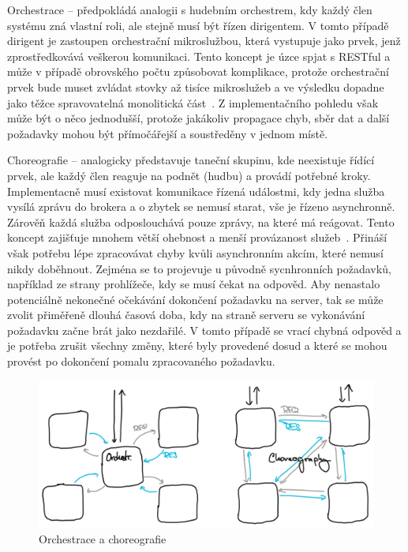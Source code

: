 \begin{dl}
   \item [Orchestrace] – předpokládá analogii s hudebním orchestrem, kdy každý člen systému zná vlastní roli, ale stejně musí být řízen dirigentem.
   V tomto případě dirigent je zastoupen orchestrační mikroslužbou, která vystupuje jako prvek, jenž zprostředkovává veškerou komunikaci.
   Tento koncept je úzce spjat s RESTful  a může v případě obrovského počtu  způsobovat komplikace, protože orchestrační prvek bude muset zvládat stovky až tisíce mikroslužeb a ve výsledku dopadne jako těžce spravovatelná monolitická část~\cite{choreovsorch}.
   Z implementačního pohledu však může být o něco jednodušší, protože jakákoliv propagace chyb, sběr dat a další požadavky mohou být přímočářejší a soustředěny v jednom místě.

   \item [Choreografie] – analogicky představuje taneční skupinu, kde neexistuje řídící prvek, ale každý člen reaguje na podnět (hudbu) a provádí potřebné kroky.
   Implementacně musí existovat komunikace řízená událostmi, kdy jedna služba vysílá zprávu do brokera a o zbytek se nemusí starat, vše je řízeno asynchronně.
   Zárověň každá služba odposlouchává pouze zprávy, na které má reágovat.
   Tento koncept zajišťuje mnohem větší ohebnost a menší provázanost služeb~\cite{choreovsorch}.
   Přináší však potřebu lépe zpracovávat chyby kvůli asynchronním akcím, které nemusí nikdy doběhnout.
   Zejména se to projevuje u původně sycnhronních požadavků, například ze strany prohlížeče, kdy se musí čekat na odpověd.
   Aby nenastalo potenciálně nekonečné očekávání dokončení požadavku na server, tak se může zvolit přiměřeně dlouhá časová doba, kdy na straně serveru se vykonávání požadavku začne brát jako nezdařilé.
   V tomto případě se vrací chybná odpověd a je potřeba zrušit všechny změny, které byly provedené dosud a které se mohou provést po dokončení pomalu zpracovaného požadavku.
\end{dl}



\begin{figure}[htbp]
   \centering
   \includegraphics[max width=\textwidth]{assets/draft-msa-communication}
   \caption{Orchestrace a choreografie }\label{fig:msa-structure-communication}
\end{figure}



